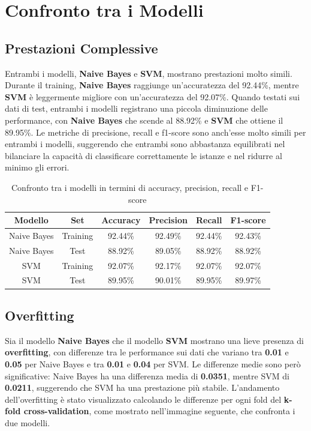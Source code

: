 \newpage

\section{Confronto tra i Modelli}

\subsection{Prestazioni Complessive}

Entrambi i modelli, \textbf{Naive Bayes} e \textbf{SVM}, mostrano prestazioni molto simili. Durante il training, \textbf{Naive Bayes} raggiunge un'accuratezza del 92.44\%, mentre \textbf{SVM} è leggermente migliore con un'accuratezza del 92.07\%. Quando testati sui dati di test, entrambi i modelli registrano una piccola diminuzione delle performance, con \textbf{Naive Bayes} che scende al 88.92\% e \textbf{SVM} che ottiene il 89.95\%. Le metriche di precisione, recall e f1-score sono anch'esse molto simili per entrambi i modelli, suggerendo che entrambi sono abbastanza equilibrati nel bilanciare la capacità di classificare correttamente le istanze e nel ridurre al minimo gli errori.

\begin{table}[H]
    \centering
    \begin{tabular}{|c|c|c|c|c|c|}
        \hline
        \textbf{Modello} & \textbf{Set} & \textbf{Accuracy} & \textbf{Precision} & \textbf{Recall} & \textbf{F1-score} \\
        \hline
        Naive Bayes & Training & 92.44\% & 92.49\% & 92.44\% & 92.43\% \\
        \hline
        Naive Bayes & Test & 88.92\% & 89.05\% & 88.92\% & 88.92\% \\
        \hline
        SVM & Training & 92.07\% & 92.17\% & 92.07\% & 92.07\% \\
        \hline
        SVM & Test & 89.95\% & 90.01\% & 89.95\% & 89.97\% \\
        \hline
    \end{tabular}
    \caption{Confronto tra i modelli in termini di accuracy, precision, recall e F1-score}
    \label{tab:confronto_metriche}
\end{table}


\subsection{Overfitting}

Sia il modello \textbf{Naive Bayes} che il modello \textbf{SVM} mostrano una lieve presenza di \textbf{overfitting}, con differenze tra le performance sui dati che variano tra \textbf{0.01} e \textbf{0.05} per Naive Bayes e tra \textbf{0.01} e \textbf{0.04} per SVM. Le differenze medie sono però significative: Naive Bayes ha una differenza media di \textbf{0.0351}, mentre SVM di \textbf{0.0211}, suggerendo che SVM ha una prestazione più stabile. L'andamento dell'overfitting è stato visualizzato calcolando le differenze per ogni fold del \textbf{k-fold cross-validation}, come mostrato nell'immagine seguente, che confronta i due modelli.

